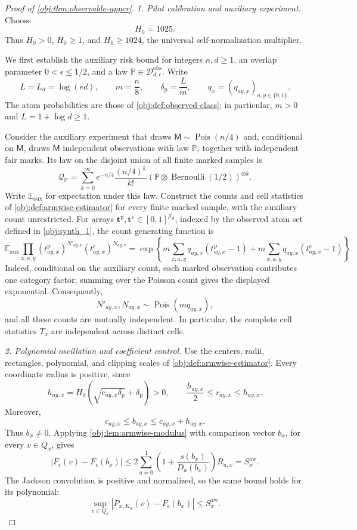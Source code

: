 \begin{proof}[Proof of \cref{obj:thm:observable-upper}]
\textit{1. Pilot calibration and auxiliary experiment.}
Choose
\[
H_0=1025.
\]
Thus \(H_0>0\), \(H_0\ge1\), and \(H_0\ge1024\), the universal self-normalization multiplier.

We first establish the auxiliary risk bound for integers \(n,d\ge1\), an overlap parameter \(0<\epsilon\le1/2\), and a law \(\mathbb P\in\mathcal D_{d,\epsilon}^{\mathrm{obs}}\). Write
\[
L=L_d=\log(ed),\qquad m=\frac n8,\qquad
\delta_{\mathrm p}=\frac Lm,\qquad
q_x=(q_{ay,x})_{a,y\in\{0,1\}}.
\]
The atom probabilities are those of \cref{obj:def:observed-class}; in particular, \(m>0\) and \(L=1+\log d\ge1\).

Consider the auxiliary experiment that draws \(\mathsf M\sim\operatorname{Pois}(n/4)\) and, conditional on \(\mathsf M\), draws \(\mathsf M\) independent observations with law \(\mathbb P\), together with independent fair marks. Its law on the disjoint union of all finite marked samples is
\[
\mathcal Q_{\mathbb P}
=
\sum_{k=0}^{\infty}
e^{-n/4}\frac{(n/4)^k}{k!}
\left(\mathbb P\otimes\operatorname{Bernoulli}(1/2)\right)^{\otimes k}.
\]
Write \(\mathbb E_{\mathrm{aux}}\) for expectation under this law. Construct the counts and cell statistics of \cref{obj:def:armwise-estimator} for every finite marked sample, with the auxiliary count unrestricted. For arrays
\(\boldsymbol t^{\mathrm p},\boldsymbol t^{\mathrm e}\in[0,1]^{\mathcal J_d}\), indexed by the observed atom set defined in \cref{obj:synth_1}, the count generating function is
\[
\mathbb E_{\mathrm{aux}}
\prod_{x,a,y}
(t^{\mathrm p}_{ay,x})^{N'_{ay,x}}
(t^{\mathrm e}_{ay,x})^{N_{ay,x}}
=
\exp\left\{
m\sum_{x,a,y}q_{ay,x}(t^{\mathrm p}_{ay,x}-1)
+
m\sum_{x,a,y}q_{ay,x}(t^{\mathrm e}_{ay,x}-1)
\right\}.
\]
Indeed, conditional on the auxiliary count, each marked observation contributes one category factor; summing over the Poisson count gives the displayed exponential. Consequently,
\[
N'_{ay,x},N_{ay,x}\sim\operatorname{Pois}(mq_{ay,x}),
\]
and all these counts are mutually independent. In particular, the complete cell statistics \(T_x\) are independent across distinct cells.

\textit{2. Polynomial oscillation and coefficient control.}
Use the centers, radii, rectangles, polynomial, and clipping scales of \cref{obj:def:armwise-estimator}. Every coordinate radius is positive, since
\[
h_{ay,x}=H_0\left(\sqrt{c_{ay,x}\delta_{\mathrm p}}+\delta_{\mathrm p}\right)>0,
\qquad
\frac{h_{ay,x}}2\le r_{ay,x}\le h_{ay,x}.
\]
Moreover,
\[
c_{ay,x}\le b_{ay,x}\le c_{ay,x}+h_{ay,x}.
\]
Thus \(b_x\ne0\). Applying \cref{obj:lem:armwise-modulus} with comparison vector \(b_x\), for every \(v\in Q_x\), gives
\[
|F_\epsilon(v)-F_\epsilon(b_x)|
\le
2\sum_{a=0}^1
\left(1+\frac{s(b_x)}{D_a(b_x)}\right)R_{a,x}
=S_x^{\mathrm{aw}}.
\]
The Jackson convolution is positive and normalized, so the same bound holds for its polynomial:
\[
\sup_{v\in Q_x}
|P_{x,K_n}(v)-F_\epsilon(b_x)|
\le S_x^{\mathrm{aw}}.
\]


\end{proof}
